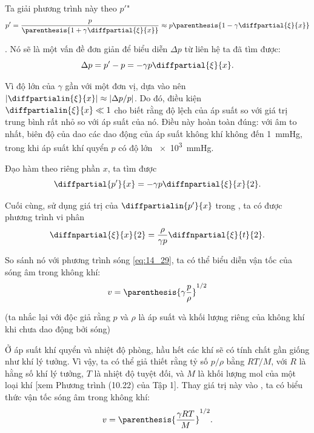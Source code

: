 \noindent
Ta giải phương trình này theo $p'$"
\begin{equation}\label{eq:14_67}
	p' = \frac{p}{\parenthesis{1 + \gamma \diffpartial{\xi}{x}}} \approx p \parenthesis{ 1 - \gamma \diffpartial{\xi}{x} }
\end{equation}

.
Nó sẽ là một vấn đề đơn giản để biểu diễn $\Delta{p}$ từ liên hệ ta đã tìm được:
\begin{equation}\label{eq:14_68}
	\Delta{p} = p' - p = - \gamma p \diffpartial{\xi}{x}.
\end{equation}

Vì độ lớn của $\gamma$ gần với một đơn vị, dựa vào  nên $|\diffpartialin{\xi}{x}| \approx |\Delta{p}/p|$.
Do đó, điều kiện $\diffpartialin{\xi}{x}\ll 1$ cho biết rằng độ lệch của áp suất so với giá trị trung bình rất nhỏ so với áp suất của nó.
Điều này hoàn toàn đúng: với âm to nhất, biên độ của dao các dao động của áp suất không khí không đến \SI{1}{\mmHg}, trong khi áp suất khí quyển $p$ có độ lớn \SI{e3}{\mmHg}.

Đạo hàm  theo riêng phần $x$, ta tìm được
\begin{equation*}
	\diffpartial{p'}{x} = - \gamma p \diffnpartial{\xi}{x}{2}.
\end{equation*}

\noindent
Cuối cùng, sử dụng giá trị của $\diffpartialin{p'}{x}$ trong , ta có được phương trình vi phân
\begin{equation*}
	\diffnpartial{\xi}{x}{2} = \frac{\rho}{\gamma p} \diffnpartial{\xi}{t}{2}.
\end{equation*}

\noindent
So sánh nó với phương trình sóng \eqref{eq:14_29}, ta có thể biểu diễn vận tốc của sóng âm trong không khí:
\begin{equation}\label{eq:14_69}
	v = \parenthesis{\gamma \frac{p}{\rho}}^{1/2}
\end{equation}

\noindent
(ta nhắc lại với độc giả rằng $p$ và $\rho$ là áp suất và khối lượng riêng của không khí khi chưa dao động bởi sóng)

Ở áp suất khí quyển và nhiệt độ phòng, hầu hết các khí sẽ có tính chất gần giống như khí lý tưởng.
Vì vậy, ta có thể giả thiết rằng tỷ số $p/\rho$ bằng $RT/M$, với $R$ là hằng số khí lý tưởng, $T$ là nhiệt độ tuyệt đối, và $M$ là khối lượng mol của một loại khí [xem Phương trình (10.22) của Tập 1].
Thay giá trị này vào , ta có biểu thức vận tốc sóng âm trong không khí:
\begin{equation}\label{eq:14_70}
	v = \parenthesis{ \frac{\gamma RT}{M}}^{1/2}.
\end{equation}


